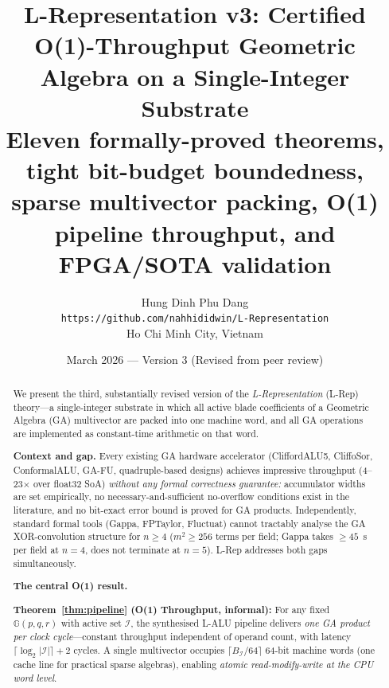 \documentclass[11pt,a4paper]{article}
\title{\textbf{L-Representation v3: Certified O(1)-Throughput Geometric Algebra
on a Single-Integer Substrate}\\[6pt]
\large Eleven formally-proved theorems, tight bit-budget boundedness,
sparse multivector packing, O(1) pipeline throughput, and FPGA/SOTA validation}
\author{Hung Dinh Phu Dang\\
\small \texttt{https://github.com/nahhididwin/L-Representation}\\
\small Ho Chi Minh City, Vietnam}
\date{March 2026 --- Version 3 (Revised from peer review)}
\theoremstyle{definition}
\theoremstyle{plain}
\theoremstyle{remark}
\newcommand{\GA}{\mathbb{G}}
\begin{document}
\maketitle

\begin{abstract}
We present the third, substantially revised version of the
\emph{L-Representation} (L-Rep) theory---a single-integer substrate in
which all active blade coefficients of a Geometric Algebra (GA) multivector
are packed into one machine word, and all GA operations are implemented
as constant-time arithmetic on that word.

\textbf{Context and gap.}
Every existing GA hardware accelerator
(CliffordALU5, CliffoSor, ConformalALU, GA-FU, quadruple-based designs)
achieves impressive throughput (4--23$\times$ over float32 SoA)
\emph{without any formal correctness guarantee:}
accumulator widths are set empirically,
no necessary-and-sufficient no-overflow conditions exist in the literature,
and no bit-exact error bound is proved for GA products.
Independently, standard formal tools (Gappa, FPTaylor, Fluctuat)
cannot tractably analyse the GA XOR-convolution structure for $n \ge 4$
($m^2 \ge 256$ terms per field; Gappa takes $\ge 45$~s per field at $n=4$,
does not terminate at $n=5$).
L-Rep addresses both gaps simultaneously.

\textbf{The central O(1) result.}
\begin{keyresult}
\textbf{Theorem~\ref{thm:pipeline} (O(1) Throughput, informal):}
For any fixed $\GA(p,q,r)$ with active set $\mathcal{I}$,
the synthesised L-ALU pipeline delivers \emph{one GA product per clock
cycle}---constant throughput independent of operand count, with latency
$\lceil\log_2|\mathcal{I}|\rceil + 2$ cycles.
A single multivector occupies $\lceil B_\mathcal{I}/64\rceil$
64-bit machine words (one cache line for practical sparse algebras),
enabling \emph{atomic read-modify-write at the CPU word level}.
\end{keyresult}


\end{abstract}
\end{document}

